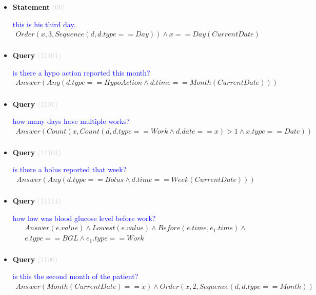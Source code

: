 \documentclass[11pt]{article}
\newcommand{\key}[1]{\textcolor{lightgray}{#1}}
\newcounter{CQuery}
\newcounter{CStatement}
\begin{document}
\begin{itemize}
\item
\textbf{Statement\theCStatement} \key{(00)} \addtocounter{CStatement}{1}
\textcolor{blue}{ this is his third day. }
\begin{multline*}
Order(x, 3, Sequence(d, d.type==Day)) \wedge x==Day(CurrentDate) \\ 
\end{multline*}


\item
\textbf{Query\theCQuery} \key{(11101)} \addtocounter{CQuery}{1}
\textcolor{blue}{ is there a hypo action reported this month? }
\begin{multline*}
Answer(Any(d.type==HypoAction \wedge d.time==Month(CurrentDate))) \\ 
\end{multline*}


\item
\textbf{Query\theCQuery} \key{(1101)} \addtocounter{CQuery}{1}
\textcolor{blue}{ how many days have multiple works? }
\begin{multline*}
Answer(Count(x, Count(d, d.type==Work \wedge d.date==x)>1 \wedge x.type==Date)) \\ 
\end{multline*}


\item
\textbf{Query\theCQuery} \key{(11101)} \addtocounter{CQuery}{1}
\textcolor{blue}{ is there a bolus reported that week? }
\begin{multline*}
Answer(Any(d.type==Bolus \wedge d.time==Week(CurrentDate))) \\ 
\end{multline*}


\item
\textbf{Query\theCQuery} \key{(11111)} \addtocounter{CQuery}{1}
\textcolor{blue}{ how low was blood glucose level before work? }
\begin{multline*}
Answer(e.value) \wedge Lowest(e.value) \wedge Before(e.time, e_1.time) \wedge \\ 
e.type==BGL \wedge e_1.type==Work \\ 
\end{multline*}


\item
\textbf{Query\theCQuery} \key{(1100)} \addtocounter{CQuery}{1}
\textcolor{blue}{ is this the second month of the patient? }
\begin{multline*}
Answer(Month(CurrentDate)==x) \wedge Order(x, 2, Sequence(d, d.type==Month)) \\ 
\end{multline*}



\end{itemize}
\end{document}
